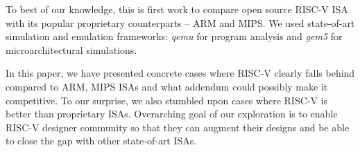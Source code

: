 
\label{sec:conc}
To best of our knowledge, this is first work to compare open source RISC-V ISA with its popular proprietary counterparts -- ARM and MIPS. We used state-of-art simulation and emulation frameworks: \textit{qemu} for program analysis and \textit{gem5} for microarchitectural simulations. 

In this paper, we have presented concrete cases where RISC-V clearly falls behind compared to ARM, MIPS ISAs and what addendum could possibly make it competitive. To our surprise, we also stumbled upon cases where RISC-V is better than proprietary ISAs. Overarching goal of our exploration is to enable RISC-V designer community so that they can augment their designs and be able to close the gap with other state-of-art ISAs.
